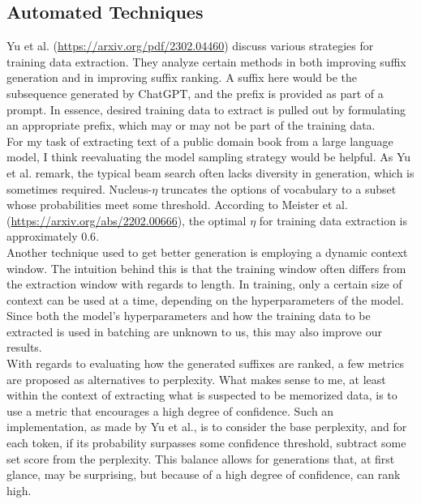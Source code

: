 \documentclass{article}
\begin{document}
	\subsection{Automated Techniques}
	Yu et al. (\url{https://arxiv.org/pdf/2302.04460}) discuss various strategies for training data extraction. They analyze certain methods in both improving suffix generation and in improving suffix ranking. A suffix here would be the subsequence generated by ChatGPT, and the prefix is provided as part of a prompt. In essence, desired training data to extract is pulled out by formulating an appropriate prefix, which may or may not be part of the training data.
	\\
	
	For my task of extracting text of a public domain book from a large language model, I think reevaluating the model sampling strategy would be helpful. As Yu et al. remark, the typical beam search often lacks diversity in generation, which is sometimes required. Nucleus-$\eta$ truncates the options of vocabulary to a subset whose probabilities meet some threshold. According to Meister et al. (\url{https://arxiv.org/abs/2202.00666}), the optimal $\eta$ for training data extraction is approximately $0.6$.
	\\
	
	Another technique used to get better generation is employing a dynamic context window. The intuition behind this is that the training window often differs from the extraction window with regards to length. In training, only a certain size of context can be used at a time, depending on the hyperparameters of the model. Since both the model's hyperparameters and how the training data to be extracted is used in batching are unknown to us, this may also improve our results.
	\\
	
	With regards to evaluating how the generated suffixes are ranked, a few metrics are proposed as alternatives to perplexity. What makes sense to me, at least within the context of extracting what is suspected to be memorized data, is to use a metric that encourages a high degree of confidence. Such an implementation, as made by Yu et al., is to consider the base perplexity, and for each token, if its probability surpasses some confidence threshold, subtract some set score from the perplexity. This balance allows for generations that, at first glance, may be surprising, but because of a high degree of confidence, can rank high.
	\\
	
\end{document}
